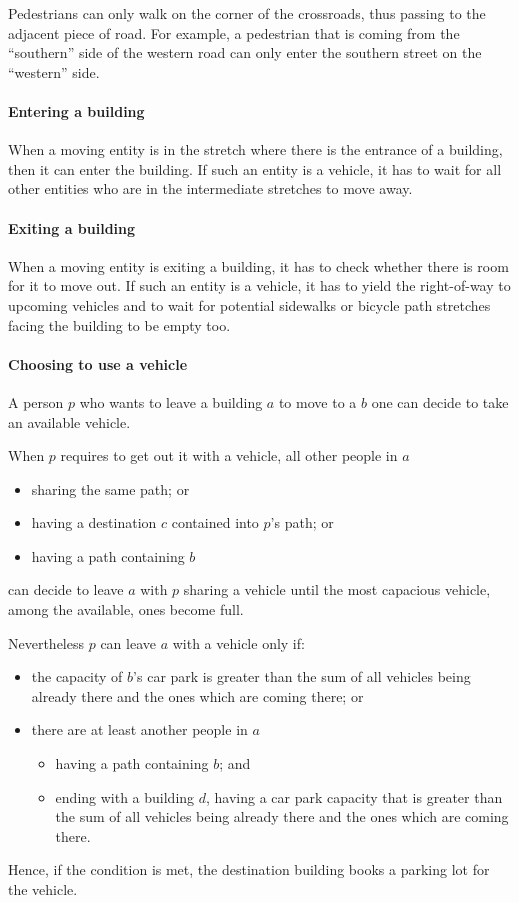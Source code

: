 Pedestrians can only walk on the corner of the crossroads, thus passing to the
adjacent piece of road. For example, a pedestrian that is coming from 
the ``southern'' side of the western road can only enter the southern street 
on the ``western'' side.

\paragraph{Entering a building} When a moving entity is in the stretch where
there is the entrance of a building, then it can enter the building.
If such an entity is a vehicle, it has to wait for all other entities who
are in the intermediate stretches to move away.

\paragraph{Exiting a building} When a moving entity is exiting a building, it
has to check whether there is room for it to move out.
If such an entity is a vehicle, it has to yield the right-of-way to 
upcoming vehicles and to wait for potential sidewalks or 
bicycle path stretches facing the building to be empty too.

\paragraph{Choosing to use a vehicle} A person $p$ who wants to leave a
building $a$ to move to a $b$ one can decide to take an available vehicle.

When $p$ requires to get out it with a vehicle,
all other people in $a$
\begin{itemize}
  \item sharing the same path; or
  \item having a destination $c$ contained into $p$'s path; or
  \item having a path containing $b$
\end{itemize}
can decide to leave $a$ with $p$ sharing a vehicle
until the most capacious vehicle, among the available, ones become full.

Nevertheless $p$ can leave $a$ with a vehicle only if:
\begin{itemize}
  \item the capacity of $b$'s car park is greater than the sum of all 
vehicles being already there and the ones which are coming there; or
  \item there are at least another people in $a$ 
  \begin{itemize}
    \item having a path containing $b$; and
    \item ending with a building $d$, having a car park capacity 
    that is greater than 
	the sum of all vehicles being already there and the ones 
	which are coming there.
  \end{itemize}
\end{itemize}
Hence, if the condition is met, the destination building books 
a parking lot for the vehicle.

